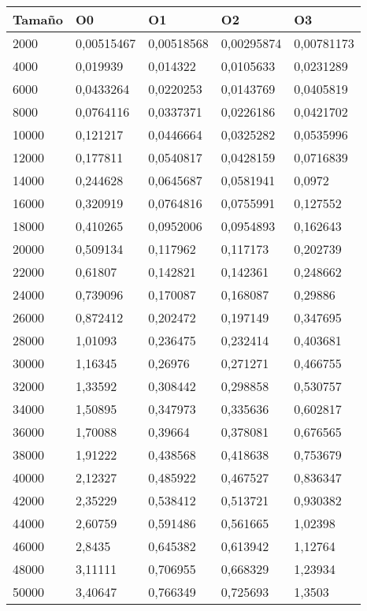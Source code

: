 \begin{tabular}{|l|l|l|l|l|}
	\hline
	Tamaño & O0 & O1 & O2 & O3 \\
	\hline
	\hline
	2000 & 0,00515467 & 0,00518568 & 0,00295874 & 0,00781173 \\
	\hline
	4000 & 0,019939 & 0,014322 & 0,0105633 & 0,0231289 \\
	\hline
	6000 & 0,0433264 & 0,0220253 & 0,0143769 & 0,0405819 \\
	\hline
	8000 & 0,0764116 & 0,0337371 & 0,0226186 & 0,0421702 \\
	\hline
	10000 & 0,121217 & 0,0446664 & 0,0325282 & 0,0535996 \\
	\hline
	12000 & 0,177811 & 0,0540817 & 0,0428159 & 0,0716839 \\
	\hline
	14000 & 0,244628 & 0,0645687 & 0,0581941 & 0,0972 \\
	\hline
	16000 & 0,320919 & 0,0764816 & 0,0755991 & 0,127552 \\
	\hline
	18000 & 0,410265 & 0,0952006 & 0,0954893 & 0,162643 \\
	\hline
	20000 & 0,509134 & 0,117962 & 0,117173 & 0,202739 \\
	\hline
	22000 & 0,61807 & 0,142821 & 0,142361 & 0,248662 \\
	\hline
	24000 & 0,739096 & 0,170087 & 0,168087 & 0,29886 \\
	\hline
	26000 & 0,872412 & 0,202472 & 0,197149 & 0,347695 \\
	\hline
	28000 & 1,01093 & 0,236475 & 0,232414 & 0,403681 \\
	\hline
	30000 & 1,16345 & 0,26976 & 0,271271 & 0,466755 \\
	\hline
	32000 & 1,33592 & 0,308442 & 0,298858 & 0,530757 \\
	\hline
	34000 & 1,50895 & 0,347973 & 0,335636 & 0,602817 \\
	\hline
	36000 & 1,70088 & 0,39664 & 0,378081 & 0,676565 \\
	\hline
	38000 & 1,91222 & 0,438568 & 0,418638 & 0,753679 \\
	\hline
	40000 & 2,12327 & 0,485922 & 0,467527 & 0,836347 \\
	\hline
	42000 & 2,35229 & 0,538412 & 0,513721 & 0,930382 \\
	\hline
	44000 & 2,60759 & 0,591486 & 0,561665 & 1,02398 \\
	\hline
	46000 & 2,8435 & 0,645382 & 0,613942 & 1,12764 \\
	\hline
	48000 & 3,11111 & 0,706955 & 0,668329 & 1,23934 \\
	\hline
	50000 & 3,40647 & 0,766349 & 0,725693 & 1,3503 \\
	\hline
\end{tabular}
